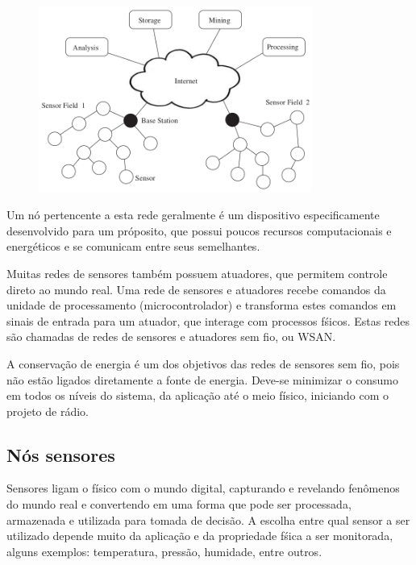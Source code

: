 \begin{figure}[h]
   \label{wsnOverview}
   \centering
   \includegraphics[width=0.8\textwidth]{figuras/wsn.png}
   \caption{\cite{dargie2010fundamentals}}
\end{figure}


Um n\'o pertencente a esta rede geralmente \'e um dispositivo especificamente desenvolvido para um pr\'oposito, que possui poucos recursos computacionais e energ\'eticos e se comunicam entre seus semelhantes.

Muitas redes de sensores tamb\'em possuem atuadores, que permitem controle direto ao mundo real. Uma rede de sensores e atuadores recebe comandos da unidade de processamento (microcontrolador) e transforma estes comandos em sinais de entrada para um atuador, que interage com processos f\'sicos. Estas redes s\~ao chamadas de redes de sensores e atuadores sem fio, ou WSAN.

A conserva\c{c}\~ao de energia \'e um dos objetivos das redes de sensores sem fio, pois n\~ao est\~ao ligados diretamente a fonte de energia. Deve-se minimizar o consumo em todos os n\'iveis do sistema, da aplica\c{c}\~ao at\'e o meio f\'isico, iniciando com o projeto de r\'adio. \cite{WsnSurvey2008} 

\subsection{N\'os sensores}
Sensores ligam o f\'isico com o mundo digital, capturando e revelando fen\^omenos do mundo real e convertendo em uma forma que pode ser processada, armazenada e utilizada para tomada de decis\~ao. A escolha entre qual sensor a ser utilizado depende muito da aplica\c{c}\~ao e da propriedade f\'sica a ser monitorada, alguns exemplos: temperatura, press\~ao, humidade, entre outros.

